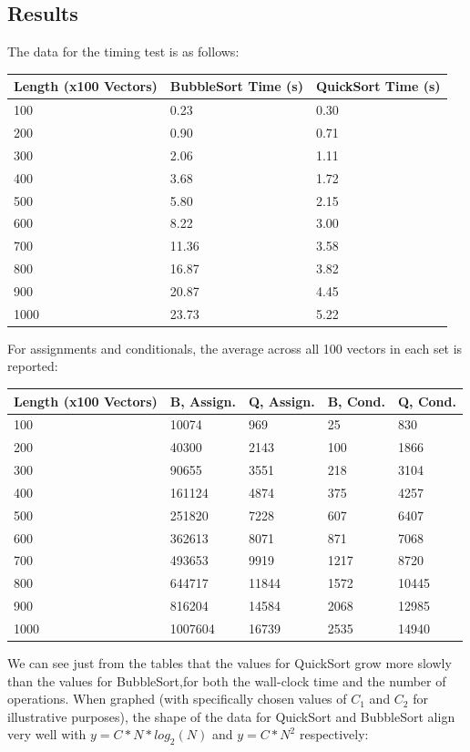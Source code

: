 \documentclass{article}
\begin{document}
\subsection{Results}
The data for the timing test is as follows:
\begin{center}
\begin{tabular}{ l l l }
 Length (x100 Vectors) & BubbleSort Time (s) & QuickSort Time (s) \\
 \hline
 100 & 0.23 & 0.30 \\ 
 200 & 0.90 & 0.71 \\  
 300 & 2.06 & 1.11 \\
 400 & 3.68 & 1.72 \\
 500 & 5.80 & 2.15 \\
 600 & 8.22 & 3.00 \\
 700 & 11.36 & 3.58 \\
 800 & 16.87 & 3.82 \\
 900 & 20.87 & 4.45 \\
 1000 & 23.73 & 5.22 \\   
\end{tabular}
\end{center}
For assignments and conditionals, the average across all 100 vectors in each set is reported:
\begin{center}
\begin{tabular}{ l l l l l}
 Length (x100 Vectors) & B, Assign. & Q, Assign. & B, Cond. & Q, Cond. \\
 \hline
 100 & 10074 & 969 & 25 & 830\\ 
 200 & 40300 & 2143 & 100 & 1866\\  
 300 & 90655 & 3551 & 218 & 3104\\
 400 & 161124 & 4874 & 375 & 4257\\
 500 & 251820 & 7228 & 607 & 6407\\
 600 & 362613 & 8071 & 871 & 7068\\
 700 & 493653 & 9919 & 1217 & 8720\\
 800 & 644717 & 11844 & 1572 & 10445\\
 900 & 816204 & 14584 & 2068 & 12985\\
 1000 & 1007604 & 16739 & 2535 & 14940\\   
\end{tabular}
\end{center}
We can see just from the tables that the values for QuickSort grow more slowly than the values for BubbleSort,for both the wall-clock time and the number of operations. When graphed (with specifically chosen values of $C_1$ and $C_2$ for illustrative purposes), the shape of the data for QuickSort and BubbleSort align very well with $y=C*N*log_2(N)$ and $y = C*N^2$ respectively: \par
\end{document}
